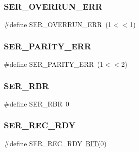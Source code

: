 \subsubsection{\texorpdfstring{S\+E\+R\+\_\+\+O\+V\+E\+R\+R\+U\+N\+\_\+\+E\+RR}{SER\_OVERRUN\_ERR}}
{\footnotesize\ttfamily \#define S\+E\+R\+\_\+\+O\+V\+E\+R\+R\+U\+N\+\_\+\+E\+RR~(1$<$$<$1)}

\hypertarget{group__ser__port_ga356ae2e9093b65d87b35a303f3092057}{}\label{group__ser__port_ga356ae2e9093b65d87b35a303f3092057} 
\subsubsection{\texorpdfstring{S\+E\+R\+\_\+\+P\+A\+R\+I\+T\+Y\+\_\+\+E\+RR}{SER\_PARITY\_ERR}}
{\footnotesize\ttfamily \#define S\+E\+R\+\_\+\+P\+A\+R\+I\+T\+Y\+\_\+\+E\+RR~(1$<$$<$2)}

\hypertarget{group__ser__port_gaab10abea0297abdcf0aab7d7d0b5662f}{}\label{group__ser__port_gaab10abea0297abdcf0aab7d7d0b5662f} 
\subsubsection{\texorpdfstring{S\+E\+R\+\_\+\+R\+BR}{SER\_RBR}}
{\footnotesize\ttfamily \#define S\+E\+R\+\_\+\+R\+BR~0}

\hypertarget{group__ser__port_ga3eb8525f2a4c6e405b2528526c71b0cf}{}\label{group__ser__port_ga3eb8525f2a4c6e405b2528526c71b0cf} 
\subsubsection{\texorpdfstring{S\+E\+R\+\_\+\+R\+E\+C\+\_\+\+R\+DY}{SER\_REC\_RDY}}
{\footnotesize\ttfamily \#define S\+E\+R\+\_\+\+R\+E\+C\+\_\+\+R\+DY~\hyperlink{video__gr_8c_a3a8ea58898cb58fc96013383d39f482c}{B\+IT}(0)}

\hypertarget{group__ser__port_ga0005836362c1dd009c7fe47720908b1b}{}\label{group__ser__port_ga0005836362c1dd009c7fe47720908b1b} 
